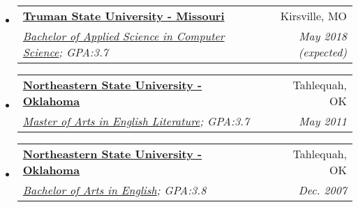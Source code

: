 \documentclass[letterpaper,11pt]{article}
\makeatletter
\newcommand{\resitem}[1]{\item #1 \vspace{-2pt}}
\newcommand{\ressubheading}[4]{
\begin{tabular*}{6.5in}{l@{\extracolsep{\fill}}r}
		\textbf{#1} & #2 \\
		\textit{#3} & \textit{#4} \\
\end{tabular*}\vspace{-6pt}}
\makeatother
\begin{document}
	\begin{itemize}
		\item
			\ressubheading {\href{http://www.truman.edu}{Truman State University - Missouri}}{Kirsville, MO}{\href{http://www.truman.edu/majors-programs/majors-minors/computer-science-major/}{Bachelor of Applied Science in Computer Science};  {GPA:3.7}}{May 2018 (expected)}
		\item	
			\ressubheading{\href{http://www.nsuok.edu}{Northeastern State University - Oklahoma}}{Tahlequah, OK}{\href{https://www.nsuok.edu/Academics/DegreesMajors/GraduateMasters.aspx}{Master of Arts in English Literature}; {GPA:3.7}}{May 2011}
		\item	
			\ressubheading{\href{http://www.nsuok.edu}{Northeastern State University - Oklahoma}}{Tahlequah, OK}{\href{https://www.nsuok.edu/Academics/DegreesMajors/Tahlequah.aspx}{Bachelor of Arts in English}; {GPA:3.8}}{Dec. 2007}
	\end{itemize} %
\end{document}
